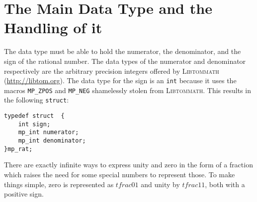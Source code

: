 \documentclass[10pt]{book}
\newcommand{\aname}[1]{{\scshape{#1}}}
\theoremstyle{definition}
\theoremstyle{remark}
\begin{document}
\section{The Main Data Type and the Handling of it}
The data type must be able to hold the numerator, the denominator, and the sign
of the rational number. The data types of the numerator and denominator
respectively are the arbitrary precision integers offered by \aname{Libtommath}
(\url{http://libtom.org}). The data type for the sign is an \lstinline!int! because
it uses the macros \lstinline!MP_ZPOS! and \lstinline!MP_NEG! shamelessly stolen from
\aname{Libtommath}. This results in the following \lstinline!struct!:
  \begin{center}
    \begin{lstlisting}[caption={Basic data type},label=structmprat]
typedef struct  {
    int sign;
    mp_int numerator;
    mp_int denominator;
}mp_rat;
    \end{lstlisting}
  \end{center}
There are exactly infinite ways to express unity and zero in the form of a
fraction which raises the need for some special numbers to represent those.
To make things simple, zero is represented as $tfrac{0}{1}$ and unity by
$tfrac{1}{1}$, both with a positive sign.
\end{document}

